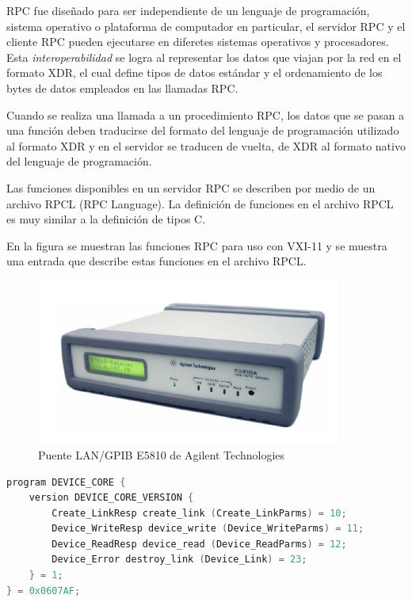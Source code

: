 \documentclass[paper=letter,oneside,fontsize=11pt, parskip=full]{scrartcl}
\begin{document}
		RPC fue diseñado para ser independiente de un lenguaje de programación, sistema operativo o plataforma de computador en particular, el servidor RPC y el cliente RPC pueden ejecutarse en diferetes sistemas operativos y procesadores.  Esta \emph{interoperabilidad} se logra al representar los datos que viajan por la red en el formato XDR, el cual define tipos de datos estándar y el ordenamiento de los bytes de datos empleados en las llamadas RPC. 
		
		Cuando se realiza una llamada a un procedimiento RPC, los datos  que se pasan a una función deben traducirse del formato del lenguaje de programación utilizado al formato XDR y en el servidor se traducen de vuelta, de XDR al formato nativo del lenguaje de programación.
		
		Las funciones disponibles en un servidor RPC se describen por medio de un archivo RPCL (RPC Language). La definición de funciones en el archivo RPCL es muy similar a la definición de tipos  C.		
		
		En la figura se muestran las funciones RPC para uso con VXI-11 y se muestra una entrada que describe estas funciones en el archivo RPCL.
				
		\begin{figure}[!h]
			\begin{center}
				\includegraphics[width=10cm]{Imagenes/E5810.pdf}
				\caption{Puente LAN/GPIB E5810 de Agilent Technologies}
				\label{Fig:PuenteLanGpib}				
			\end{center}
		\end{figure}
	
			\begin{lstlisting}[language=c]	
program DEVICE_CORE { 
	version DEVICE_CORE_VERSION { 
		Create_LinkResp create_link (Create_LinkParms) = 10; 
		Device_WriteResp device_write (Device_WriteParms) = 11; 
		Device_ReadResp device_read (Device_ReadParms) = 12; 
		Device_Error destroy_link (Device_Link) = 23; 
	} = 1; 
} = 0x0607AF;	
			\end{lstlisting}
		
\end{document}
